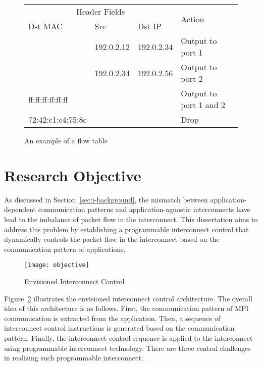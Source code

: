 \begin{figure}
\centering
\begin{tabular}{lllll}
\toprule
\multicolumn{3}{c}{Header Fields} & \multirow{2}{*}{Action} \\ \cmidrule(rl){1-3}
Dst MAC     & Src     & Dst IP    &                         \\ \midrule
                  & 192.0.2.12 & 192.0.2.34  & Output to port 1         \\
                  & 192.0.2.34 & 192.0.2.56  & Output to port 2         \\
ff:ff:ff:ff:ff:ff &            &             & Output to port 1 and 2   \\
72:42:c1:e4:75:8c &            &             & Drop                     \\
\bottomrule
\end{tabular}
\caption{An example of a flow table}%
\label{tbl:flow-table}
\end{figure}


\section{Research Objective}

As discussed in Section~\ref{sec:i-background}, the mismatch between
application-dependent communication patterns and application-agnostic
interconnects have lead to the imbalance of packet flow in the interconnect.
This dissertation aims to address this problem by establishing a programmable
interconnect control that dynamically controls the packet flow in the
interconnect based on the communication pattern of applications.

\begin{figure}
    \centering
    \texttt{[image: objective]}
    \caption{Envisioned Interconnect Control}%
    \label{fig:objective}
\end{figure}

Figure~\ref{fig:objective} illustrates the envisioned interconnect control
architecture. The overall idea of this architecture is as follows. First, the
communication pattern of MPI communication is extracted from the application.
Then, a sequence of interconnect control instructions is generated based on
the communication pattern. Finally, the interconnect control sequence is
applied to the interconnect using programmable interconnect technology.
There are three central challenges in realizing such programmable interconnect:

